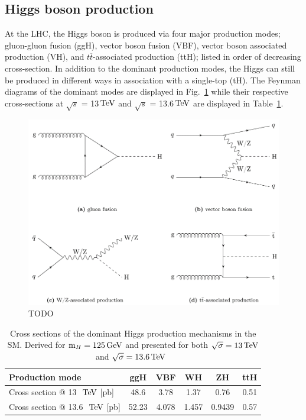 \subsection{Higgs boson production}

At the \ac{LHC}, the Higgs boson is produced via four major production modes; gluon-gluon fusion (ggH), vector boson fusion (VBF), vector boson associated production (VH), and $t\overline{t}$-associated production (ttH); listed in order of decreasing cross-section. In addition to the dominant production modes, the Higgs can still be produced in different ways \eg in association with a single-top (tH). The Feynman diagrams of the dominant modes are displayed in Fig.~\ref{Figure:Introduction_HiggsProductionModes} while their respective cross-sections at $\sqrt{s}$ = 13$\,\text{Te\hspace{-.08em}V}$ and $\sqrt{s}$ = 13.6$\,\text{Te\hspace{-.08em}V}$ are displayed in Table~\ref{Table:Introduction_HiggsProduction_XS}. 

\begin{figure}[h]
\centering
\includegraphics[width= .9\textwidth]{Figures/Introduction/Higgs_ProductionModes.png}
\caption{TODO }
\label{Figure:Introduction_HiggsProductionModes}
\end{figure}

\begin{table}[h]
\centering
\begin{tabular}{l|c|c|c|c|c}
\hline
Production mode                   & ggH   & VBF   & WH    & ZH     & ttH  \\ \hline
Cross section @ 13~$\,\text{Te\hspace{-.08em}V}$ {[}pb{]}   & 48.6  & 3.78  & 1.37  & 0.76   & 0.51 \\
\hline
Cross section @ 13.6~$\,\text{Te\hspace{-.08em}V}$ {[}pb{]} & 52.23 & 4.078 & 1.457 & 0.9439 & 0.57
\end{tabular}
\caption{Cross sections of the dominant Higgs production mechanisms in the SM. Derived for $\text{m}_H = 125\,\text{Ge\hspace{-.08em}V}$ and presented for both $\sqrt{\sigma}=13\,\text{Te\hspace{-.08em}V}$ and $\sqrt{\sigma}=13.6\,\text{Te\hspace{-.08em}V}$~\cite{HiggsProduction_XS}}
\label{Table:Introduction_HiggsProduction_XS}
\end{table}

